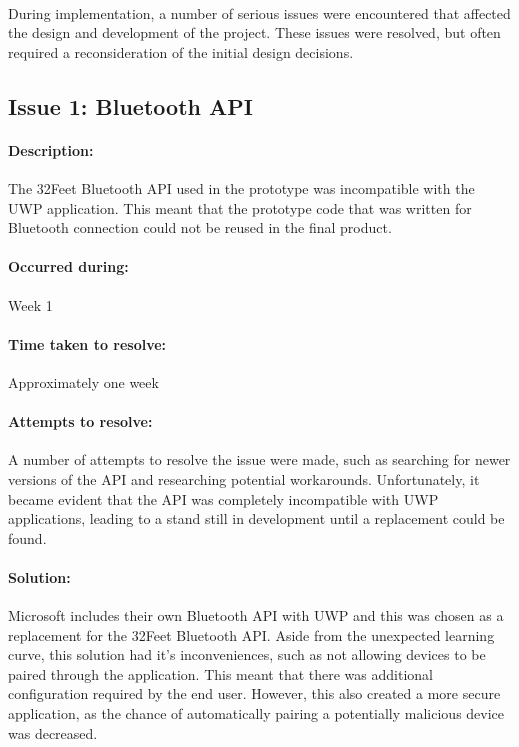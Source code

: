 	\paragraph{}{
	During implementation, a number of serious issues were encountered that affected the design and development of the project. These issues were resolved, but often required a reconsideration of the initial design decisions.
	}
	
	\subsection{Issue 1: Bluetooth API}
		\paragraph{Description:}{
		The 32Feet Bluetooth API used in the prototype was incompatible with the UWP application. This meant that the prototype code that was written for Bluetooth connection could not be reused in the final product.
		}
		\paragraph{Occurred during:}{
		Week 1
		}
		\paragraph{Time taken to resolve:}{
		Approximately one week
		}
		\paragraph{Attempts to resolve:}{
		A number of attempts to resolve the issue were made, such as searching for newer versions of the API and researching potential workarounds. Unfortunately, it became evident that the API was completely incompatible with UWP applications, leading to a stand still in development until a replacement could be found.
		}
		\paragraph{Solution:}{
		Microsoft includes their own Bluetooth API with UWP and this was chosen as a replacement for the 32Feet Bluetooth API. Aside from the unexpected learning curve, this solution had it's inconveniences, such as not allowing devices to be paired through the application. This meant that there was additional configuration required by the end user. However, this also created a more secure application, as the chance of automatically pairing a potentially malicious device was decreased.
		}
